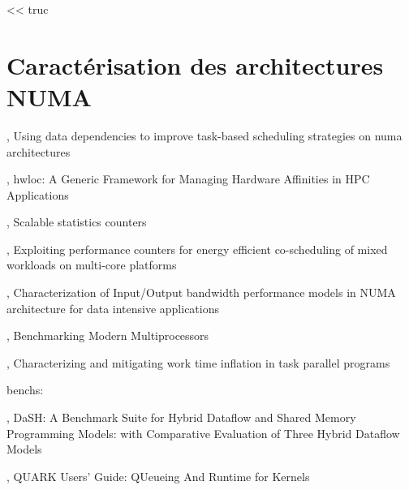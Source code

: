 
\begin{savequote}[6cm]
<< truc
\end{savequote}

\chapter{Caractérisation des architectures NUMA}\label{chap:contrib:characterization}
\chaptertoc







%
\cite{Virouleau2016b}, Using data dependencies to improve task-based scheduling strategies on numa architectures

\cite{Broquedis2010}, hwloc: {A} Generic Framework for Managing Hardware Affinities in {HPC} Applications


\cite{Dice2013}, Scalable statistics counters

\cite{Libutti2014}, Exploiting performance counters for energy efficient co-scheduling of mixed workloads on multi-core platforms

\cite{Li2013}, Characterization of Input/Output bandwidth performance models in NUMA architecture for data intensive applications

\cite{Bienia2011}, Benchmarking Modern Multiprocessors

\cite{Olivier2013}, Characterizing and mitigating work time inflation in task parallel programs

benchs:

\cite{Gajinov2014}, DaSH: A Benchmark Suite for Hybrid Dataflow and Shared Memory Programming Models: with Comparative Evaluation of Three Hybrid Dataflow Models

\cite{YarKhan2011}, QUARK Users' Guide: QUeueing And Runtime for Kernels

